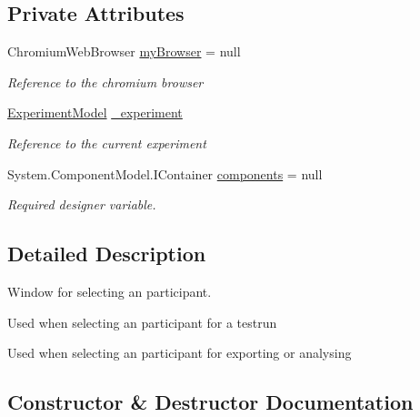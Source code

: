 \subsection*{Private Attributes}
\begin{DoxyCompactItemize}
\item 
Chromium\+Web\+Browser \hyperlink{class_web_analyzer_1_1_u_i_1_1_select_participant_form_af929c5af133ce3c9fd5b3f4a35ca5d4d}{my\+Browser} = null
\begin{DoxyCompactList}\small\item\em Reference to the chromium browser \end{DoxyCompactList}\item 
\hyperlink{class_web_analyzer_1_1_models_1_1_base_1_1_experiment_model}{Experiment\+Model} \hyperlink{class_web_analyzer_1_1_u_i_1_1_select_participant_form_a4ed056aa554cc9190767e0498d94670e}{\+\_\+experiment}
\begin{DoxyCompactList}\small\item\em Reference to the current experiment \end{DoxyCompactList}\item 
System.\+Component\+Model.\+I\+Container \hyperlink{class_web_analyzer_1_1_u_i_1_1_select_participant_form_ab40ec19ffcba7ebc9d14e90f8a14708e}{components} = null
\begin{DoxyCompactList}\small\item\em Required designer variable. \end{DoxyCompactList}\end{DoxyCompactItemize}


\subsection{Detailed Description}
Window for selecting an participant. 


\begin{DoxyEnumerate}
\item Used when selecting an participant for a testrun
\item Used when selecting an participant for exporting or analysing 
\end{DoxyEnumerate}

\subsection{Constructor \& Destructor Documentation}
\hypertarget{class_web_analyzer_1_1_u_i_1_1_select_participant_form_a82850c88bc4d315c7fedd26333c844bd}{}
